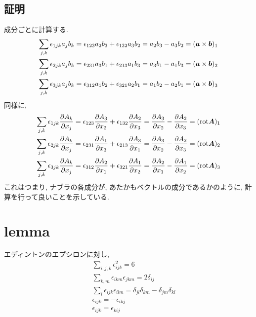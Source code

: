 \documentclass{jsarticle}
\newcommand*{\mbold}[1]{\mbox{\boldmath $#1$}}
\newcommand*{\rot}{{\rm rot}}
\begin{document}
\subsection{証明}
成分ごとに計算する. 
\begin{eqnarray}
  \sum_{j, k}\epsilon_{1jk}a_j b_k = \epsilon_{123}a_2 b_3 + \epsilon_{132}a_3 b_2 = a_2 b_3 - a_3 b_2 = (\mbold{a} \times \mbold{b})_1 \nonumber \\
  \sum_{j, k}\epsilon_{2jk}a_j b_k = \epsilon_{231}a_3 b_1 + \epsilon_{213}a_1 b_3 = a_3 b_1 - a_1 b_3 = (\mbold{a} \times \mbold{b})_2 \nonumber \\
  \sum_{j, k}\epsilon_{3jk}a_j b_k = \epsilon_{312}a_1 b_2 + \epsilon_{321}a_2 b_1 = a_1 b_2 - a_2 b_1 = (\mbold{a} \times \mbold{b})_3
\end{eqnarray}
同様に, 
\begin{eqnarray}
  \sum_{j, k}\epsilon_{1jk}\frac{\partial A_k}{\partial x_j}
  = \epsilon_{123}\frac{\partial A_3}{\partial x_2} + \epsilon_{132}\frac{\partial A_2}{\partial x_3}
  = \frac{\partial A_3}{\partial x_2} - \frac{\partial A_2}{\partial x_3} = (\rot \mbold{A})_1 \nonumber \\
  \sum_{j, k}\epsilon_{2jk}\frac{\partial A_k}{\partial x_j}
  = \epsilon_{231}\frac{\partial A_1}{\partial x_3} + \epsilon_{213}\frac{\partial A_3}{\partial x_1}
  = \frac{\partial A_3}{\partial x_2} - \frac{\partial A_2}{\partial x_3} = (\rot \mbold{A})_2 \nonumber \\
  \sum_{j, k}\epsilon_{3jk}\frac{\partial A_k}{\partial x_j}
  = \epsilon_{312}\frac{\partial A_2}{\partial x_1} + \epsilon_{321}\frac{\partial A_1}{\partial x_2}
  = \frac{\partial A_2}{\partial x_1} - \frac{\partial A_1}{\partial x_2} = (\rot \mbold{A})_3 \nonumber \\
\end{eqnarray}
これはつまり, ナブラの各成分が, あたかもベクトルの成分であるかのように, 計算を行って良いことを示している. 
\section{lemma}
エディントンのエプシロンに対し, 
\begin{subequations}
  \begin{eqnarray}
    && \sum_{i, j, k}\epsilon_{ijk}^2 = 6 \\
    && \sum_{k, m}\epsilon_{ikm}\epsilon_{jkm} = 2\delta_{ij} \\
    && \sum_{i}\epsilon_{ijk}\epsilon_{ilm} = \delta_{jl}\delta_{km} - \delta_{jm}\delta_{kl} \\
    && \epsilon_{ijk} = - \epsilon_{ikj} \\
    && \epsilon_{ijk} = \epsilon_{kij}
  \end{eqnarray}
\end{subequations}
\end{document}
